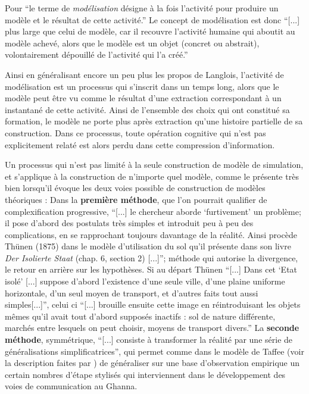 
Pour \textcite[36]{Langlois2005} \enquote{le terme de \textit{modélisation} désigne à la fois l'activité pour produire un modèle et le résultat de cette activité.} Le concept de modélisation est donc \enquote{[...] plus large que celui de modèle, car il recouvre l'activité humaine qui aboutit au modèle achevé, alors que le modèle est un objet (concret ou abstrait), volontairement dépouillé de l'activité qui l'a créé.} 

Ainsi en généralisant encore un peu plus les propos de Langlois, l'activité de modélisation est un processus qui s'inscrit dans un temps long, alors que le modèle peut être vu comme le résultat d'une extraction correspondant à un instantané de cette activité. Ainsi de l'ensemble des choix qui ont constitué sa formation, le modèle ne porte plus après extraction qu'une histoire partielle de sa construction. Dans ce processus, toute opération cognitive qui n'est pas explicitement relaté est alors perdu dans cette compression d'information.

Un processus qui n'est pas limité à la seule construction de modèle de simulation, et s'applique à la construction de n'importe quel modèle, comme le présente très bien \textcite[32-33]{Haggett1965} lorsqu'il évoque les deux voies possible de construction de modèles théoriques : Dans la \textbf{première méthode}, que l'on pourrait qualifier de complexification progressive, \enquote{[...] le chercheur aborde \enquote{furtivement} un problème; il pose d'abord des postulats très simples et introduit peu à peu des complications, en se rapprochant toujours davantage de la réalité. Ainsi procède Thünen (1875) dans le modèle d'utilisation du sol qu'il présente dans son livre \textit{Der Isolierte Staat} (chap. 6, section 2) [...]}; méthode qui autorise la divergence, le retour en arrière sur les hypothèses. Si au départ Thünen \enquote{[...] Dans cet \enquote{Etat isolé} [...] suppose d'abord l'existence d'une seule ville, d'une plaine uniforme horizontale, d'un seul moyen de transport, et d'autres faits tout aussi simples[...]}, celui ci \enquote{[...] brouille ensuite cette image en réintroduisant les objets mêmes qu'il avait tout d'abord supposés inactifs : sol de nature différente, marchés entre lesquels on peut choisir, moyens de transport divers.} La \textbf{seconde méthode}, symmétrique, \enquote{[...] consiste à transformer la réalité par une série de généralisations simplificatrices}, qui permet comme dans le modèle de Taffee (voir la description faites par \textcite[93-96]{Haggett1965}) de généraliser sur une base d'observation empirique un certain nombres d'étape stylisés qui interviennent dans le développement des voies de communication au Ghanna.

